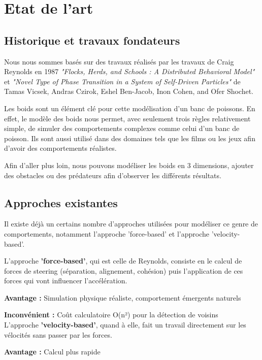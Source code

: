 \documentclass[11pt,a4paper]{article}
\begin{document}

\section{Etat de l'art}
\subsection{Historique et travaux fondateurs}
Nous nous sommes basés sur des travaux réalisés par les travaux de Craig Reynolds en 1987 \textit{"Flocks, Herds, and Schools : A Distributed Behavioral Model"} et \textit{"Novel Type of Phase Transition in a System of Self-Driven Particles"} de Tamas Vicsek, Andras Czirok, Eshel Ben-Jacob, Inon Cohen, and Ofer Shochet.

Les boids sont un élément clé pour cette modélisation d'un banc de poissons. En effet, le modèle des boids nous permet, avec seulement trois règles relativement simple, de simuler des comportements complexes comme celui d'un banc de poisson. Ils sont aussi utilisé dans des domaines tels que les films ou les jeux afin d'avoir des comportements réalistes.

Afin d'aller plus loin, nous pouvons modéliser les boids en 3 dimensions, ajouter des obstacles ou des prédateurs afin d'observer les différents résultats.

\subsection{Approches existantes}
Il existe déjà un certains nombre d'approches utilisées pour modéliser ce genre de comportements, notamment l'approche 'force-based' et l'approche 'velocity-based'.

L'approche \textbf{'force-based'}, qui est celle de Reynolds, consiste en le calcul de forces de steering (séparation, alignement, cohésion) puis l'application de ces forces qui vont influencer l'accélération.

\textbf{Avantage :} Simulation physique réaliste, comportement émergents naturels

\textbf{Inconvénient :} Coût calculatoire O(n²) pour la détection de voisins
\\
L'approche \textbf{'velocity-based'}, quand à elle, fait un travail directement sur les vélocités sans passer par les forces.

\textbf{Avantage :} Calcul plus rapide
\end{document}
